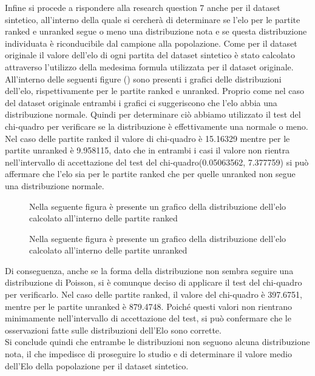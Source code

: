 Infine si procede a rispondere alla research question 7 anche per il dataset sintetico, all'interno della quale si cercherà di determinare se l’elo per le partite ranked e unranked segue o meno una distribuzione nota e se questa distribuzione individuata è riconducibile dal campione alla popolazione. Come per il dataset originale il valore dell’elo di ogni partita del dataset sintetico è stato calcolato attraverso l’utilizzo della medesima formula utilizzata per il dataset originale. \\
All’interno delle seguenti figure () sono presenti i grafici delle distribuzioni dell'elo, rispettivamente per le partite ranked e unranked. Proprio come nel caso del dataset originale entrambi i grafici ci suggeriscono che l’elo abbia una distribuzione normale. Quindi per determinare ciò abbiamo utilizzato il test del chi-quadro per verificare se la distribuzione è effettivamente una normale o meno.
Nel caso delle partite ranked il valore di chi-quadro è 15.16329 mentre per le partite unranked è 9.958115, dato che in entrambi i casi il valore non rientra nell’intervallo di accettazione del test del chi-quadro(0.05063562, 7.377759) si può affermare che l’elo sia per le partite ranked che per quelle unranked non segue una distribuzione normale. \\
\begin{figure}[htbp]
\centering
\begin{multicols}{2}
\hspace*{-0.1\linewidth}

\caption{Nella seguente figura è presente un grafico della distribuzione dell'elo calcolato all'interno delle partite ranked}
\label{distribuzione_elo_ranked_sintetico}
\hspace*{-0.1\linewidth}

\caption{Nella seguente figura è presente un grafico della distribuzione dell'elo calcolato all'interno delle partite unranked}
\label{distribuzione_elo_unranked_sintetico}
\end{multicols}
\end{figure} 
Di conseguenza, anche se la forma della distribuzione non sembra seguire una distribuzione di Poisson, si è comunque deciso di applicare il test del chi-quadro per verificarlo. Nel caso delle partite ranked, il valore del chi-quadro è 397.6751, mentre per le partite unranked è 879.4748. Poiché questi valori non rientrano minimamente nell’intervallo di accettazione del test, si può confermare che le osservazioni fatte sulle distribuzioni dell’Elo sono corrette. \\
Si conclude quindi che entrambe le distribuzioni non seguono alcuna distribuzione nota, il che impedisce di proseguire lo studio e di determinare il valore medio dell’Elo della popolazione per il dataset sintetico. 
